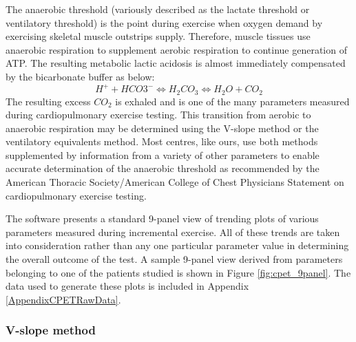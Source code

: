 The anaerobic threshold (variously described as the lactate threshold or ventilatory threshold) is the point during exercise when oxygen demand by exercising skeletal muscle outstrips supply. Therefore, muscle tissues use anaerobic respiration to supplement aerobic respiration to continue generation of ATP. The resulting metabolic lactic acidosis is almost immediately compensated by the bicarbonate buffer as below: 
\begin{equation} \label{eq:bicarb_buffer}
	H^+ + HCO3^- \Longleftrightarrow H_2CO_3 \Longleftrightarrow H_2O + CO_2
\end{equation}
The resulting excess $CO_2$ is exhaled and is one of the many parameters measured during cardiopulmonary exercise testing. This transition from aerobic to anaerobic respiration may be determined using the V-slope method\parencite{sue_metabolic_1988} or the ventilatory equivalents method.\parencite{beaver_new_1986} Most centres, like ours, use both methods supplemented by information from a variety of other parameters to enable accurate determination of the anaerobic threshold as recommended by the American Thoracic Society/American College of Chest Physicians Statement on cardiopulmonary exercise testing.\parencite{society_ats/accp_2003}

The software presents a standard 9-panel view of trending plots of various parameters measured during incremental exercise. All of these trends are taken into consideration rather than any one particular parameter value in determining the overall outcome of the test. A sample 9-panel view derived from parameters belonging to one of the patients studied is shown in Figure \ref{fig:cpet_9panel}. The data used to generate these plots is included in Appendix \ref{AppendixCPETRawData}. 

\subsubsection{V-slope method}

